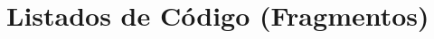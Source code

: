 \documentclass[11pt,a4paper]{article}
\begin{document}
\appendix
\section{Listados de Código (Fragmentos)}
% 

% 
\end{document}
